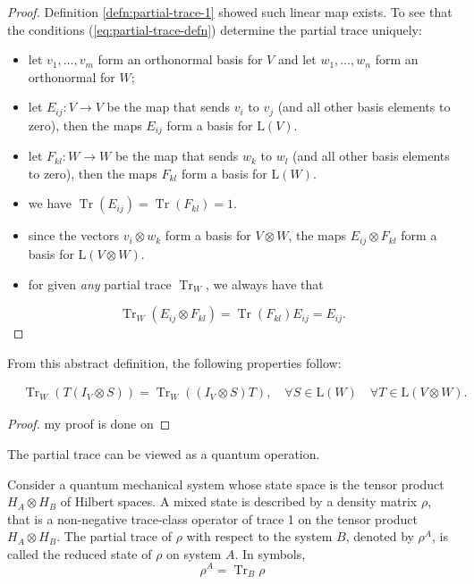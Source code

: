 \begin{proof} %
Definition \ref{defn:partial-trace-1} showed such linear map exists.
To see that the conditions (\ref{eq:partial-trace-defn}) determine the partial trace uniquely:
\begin{itemize}
  \item let $v_1, \ldots, v_m$ form an orthonormal basis for $V$ and let $w_1, \ldots, w_n$ form an orthonormal for $W$;
  \item let $E_{i j}: V \rightarrow V$ be the map that sends $v_i$ to $v_j$ (and all other basis elements to zero), then the maps $E_{i j}$ form a basis for $\mathrm{L}(V)$.
  \item let $F_{k l}: W \rightarrow W$ be the map that sends $w_k$ to $w_l$ (and all other basis elements to zero), then the maps $F_{k l}$ form a basis for $\mathrm{L}(W)$.
  \item we have $\operatorname{Tr}(E_{ij})=\operatorname{Tr}(F_{kl})=1.$
  \item since the vectors $v_i \otimes w_k$ form a basis for $V \otimes W$, the maps $E_{i j} \otimes F_{k l}$ form a basis for $\mathrm{L}(V \otimes W)$.
  \item for given \textit{any} partial trace $\operatorname{Tr}_W$, we always have that
\end{itemize}
$$
\operatorname{Tr}_W(E_{i j} \otimes F_{k l})=\operatorname{Tr}(F_{k l}) E_{i j} = E_{i j}.
$$
\end{proof}

From this abstract definition, the following properties follow:

\begin{proposition}
$$
\begin{aligned}
& \operatorname{Tr}_W\left(T\left(I_V \otimes S\right)\right)=\operatorname{Tr}_W\left(\left(I_V \otimes S\right) T\right) ,\quad \forall S \in \mathrm{L}(W) \quad \forall T \in \mathrm{L}(V \otimes W).
\end{aligned}
$$
\end{proposition}

\begin{proof}
    my proof is done on
\end{proof}

The partial trace can be viewed as a quantum operation.

Consider a quantum mechanical system whose state space is the tensor product $H_A \otimes H_B$ of Hilbert spaces. A mixed state is described by a density matrix $\rho$, that is a non-negative trace-class operator of trace 1 on the tensor product $H_A \otimes H_B$. The partial trace of $\rho$ with respect to the system $B$, denoted by $\rho^A$, is called the reduced state of $\rho$ on system $A$. In symbols,
$$
\rho^A=\operatorname{Tr}_B \rho
$$

